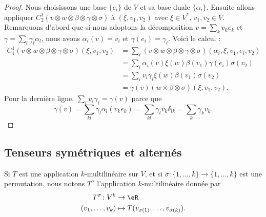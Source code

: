 \begin{proof}
	Nous choisissons une base \( \{ e_i \}\) de \( V\) et sa base duale \( \{ \alpha_i \}\). Ensuite allons appliquer \( C_2^1(v\otimes w\otimes \beta\otimes \gamma\otimes \sigma)\) à \( (\xi,v_1,v_2)\) avec \( \xi\in V^*\), \( v_1,v_2\in V\). Remarquons d'abord que si nous adoptons la décomposition \( v=\sum_kv_ke_k\) et \( \gamma=\sum_l\gamma_l\alpha_l\), nous avons \( \alpha_i(v)=v_i\) et \( \gamma(e_i)=\gamma_i\). Voici le calcul :
	\begin{subequations}
		\begin{align}
			C_1^1(v\otimes w\otimes \beta\otimes \gamma\otimes \sigma)(\xi,v_1,v_2) & = \sum_i(v\otimes w\otimes \beta\otimes \gamma\otimes \sigma)(\alpha_i,\xi,v_1,e_i,v_2) \\
			                                                                        & =\sum_i \alpha_i(v)\xi(w)\beta(v_1)\gamma(e_i)\sigma(v_2)                               \\
			                                                                        & =\sum_iv_i\gamma_i\xi(w)\beta(v_1)\sigma(v_2)                                           \\
			                                                                        & =\gamma(v)(w\times \beta\otimes \sigma)(\xi,v_1,v_2).
		\end{align}
	\end{subequations}
	Pour la dernière ligne, \( \sum_iv_i\gamma_i=\gamma(v)\) parce que
	\begin{equation}
		\gamma(v)=\sum_{kl}\gamma_l\alpha_l(v_ke_k)=\sum_{kl}\gamma_lv_k\delta_{lk}=\sum_k\gamma_kv_k.
	\end{equation}
\end{proof}


\subsection{Tenseurs symétriques et alternés}

Si \( T\) est une application \( k\)-multilinéaire sur \( V\), et si \(\sigma \colon \{ 1,\ldots,k \}\to \{ 1,\ldots,k \}  \) est une permutation, nous notons \( T^{\sigma} \) l'application \( k\)-multilinéaire donnée par
\begin{equation}
	\begin{aligned}
		T^{\sigma}\colon V^k & \to \eR                                         \\
		(v_1,\ldots,v_k)     & \mapsto T(v_{\sigma(1)},\ldots, v_{\sigma(k)}).
	\end{aligned}
\end{equation}

